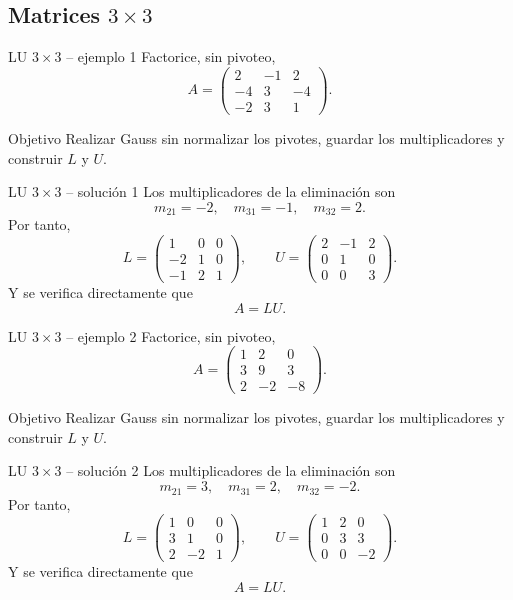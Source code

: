 \documentclass[aspectratio=169,10pt]{beamer}
\begin{document}
\subsection{Matrices $3\times 3$}
\begin{frame}{LU $3\times 3$ -- ejemplo 1}
\small
Factorice, sin pivoteo,
\[
A=\begin{pmatrix}2 & -1 & 2\\-4 & 3 & -4\\-2 & 3 & 1\end{pmatrix}.
\]
\begin{block}{Objetivo}
Realizar Gauss sin normalizar los pivotes, guardar los multiplicadores y construir $L$ y $U$.
\end{block}
\end{frame}
\begin{frame}{LU $3\times 3$ -- solución 1}
\small
Los multiplicadores de la eliminación son
\[
m_{21}=-2,\quad m_{31}=-1,\quad m_{32}=2.
\]
Por tanto,
\[
L=\begin{pmatrix}1 & 0 & 0\\-2 & 1 & 0\\-1 & 2 & 1\end{pmatrix},\qquad U=\begin{pmatrix}2 & -1 & 2\\0 & 1 & 0\\0 & 0 & 3\end{pmatrix}.
\]
Y se verifica directamente que
\[
\boxed{A=LU}.
\]
\end{frame}
\begin{frame}{LU $3\times 3$ -- ejemplo 2}
\small
Factorice, sin pivoteo,
\[
A=\begin{pmatrix}1 & 2 & 0\\3 & 9 & 3\\2 & -2 & -8\end{pmatrix}.
\]
\begin{block}{Objetivo}
Realizar Gauss sin normalizar los pivotes, guardar los multiplicadores y construir $L$ y $U$.
\end{block}
\end{frame}
\begin{frame}{LU $3\times 3$ -- solución 2}
\small
Los multiplicadores de la eliminación son
\[
m_{21}=3,\quad m_{31}=2,\quad m_{32}=-2.
\]
Por tanto,
\[
L=\begin{pmatrix}1 & 0 & 0\\3 & 1 & 0\\2 & -2 & 1\end{pmatrix},\qquad U=\begin{pmatrix}1 & 2 & 0\\0 & 3 & 3\\0 & 0 & -2\end{pmatrix}.
\]
Y se verifica directamente que
\[
\boxed{A=LU}.
\]
\end{frame}
\end{document}
